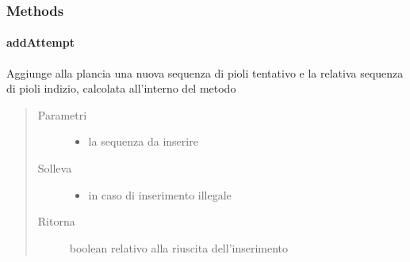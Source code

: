 \documentclass[letterpaper,10pt,italian,openany,oneside]{sphinxmanual}
\begin{document}
\subsubsection{Methods}
\label{\detokenize{source/it/unicam/cs/pa/mastermind/gamecore/BoardModel:methods}}

\paragraph{addAttempt}
\label{\detokenize{source/it/unicam/cs/pa/mastermind/gamecore/BoardModel:addattempt}}

\begin{fulllineitems}
\label{\detokenize{source/it/unicam/cs/pa/mastermind/gamecore/BoardModel:it.unicam.cs.pa.mastermind.gamecore.BoardModel.addAttempt(List)}}
Aggiunge alla plancia una nuova sequenza di pioli tentativo e la relativa sequenza di pioli indizio, calcolata all’interno del metodo
\begin{quote}\begin{description}
\item[{Parametri}] \leavevmode\begin{itemize}
\item {} 
 \textendash{} la sequenza da inserire

\end{itemize}

\item[{Solleva}] \leavevmode\begin{itemize}
\item {} 
 \textendash{} in caso di inserimento illegale

\end{itemize}

\item[{Ritorna}] \leavevmode
boolean relativo alla riuscita dell’inserimento

\end{description}\end{quote}

\end{fulllineitems}
\end{document}

